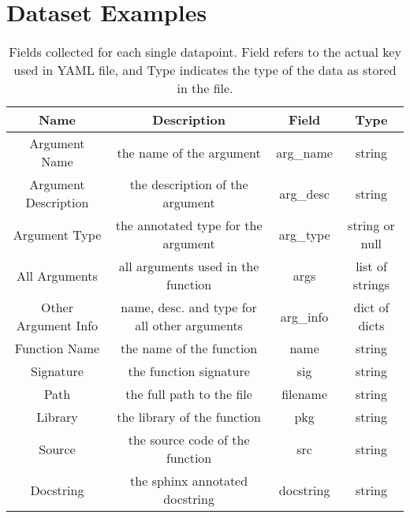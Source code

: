 \chapter{Dataset Examples}
\label{example_datapoint}


\begin{table}[h!]
    \begin{center}
    \begin{tabular}{| c | c | c | c |}
        \hline
        Name &  Description     &    Field    & Type  \\
        \hline
        Argument Name & the name of the argument  & arg\_name & string \\
        Argument Description & the description of the argument & arg\_desc & string \\
        Argument Type & the annotated type for the argument & arg\_type & string or null \\
        All Arguments & all arguments used in the function & args & list of strings \\
        Other Argument Info & name, desc. and type for all other arguments & arg\_info & dict of dicts\\
        Function Name & the name of the function & name & string\\
        Signature & the function signature & sig & string\\
        Path & the full path to the file & filename & string \\
        Library & the library of the function & pkg & string\\
        Source & the source code of the function & src & string\\
        Docstring & the sphinx annotated docstring & docstring & string\\

        \hline


    \end{tabular}
    \caption {Fields collected for each single datapoint. Field refers to the actual key used in YAML file, and Type indicates the type of the data as stored in the file.}
    \label{table:metadata}
    \end{center}
\end{table}




